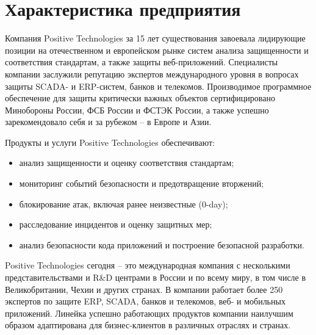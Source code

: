 \section{Характеристика предприятия}

Компания Positive Technologies за 15 лет существования завоевала лидирующие позиции на отечественном и европейском рынке систем анализа защищенности и соответствия стандартам, а также защиты веб-приложений. Специалисты компании заслужили репутацию экспертов международного уровня в вопросах защиты SCADA- и ERP-систем, банков и телекомов. Производимое программное обеспечение для защиты критически важных объектов сертифицировано Минобороны России, ФСБ России и ФСТЭК России, а также успешно зарекомендовало себя и за рубежом – в Европе и Азии.\par

Продукты и услуги Positive Technologies обеспечивают:
\begin{itemize}
    \item анализ защищенности и оценку соответствия стандартам;
    \item мониторинг событий безопасности и предотвращение вторжений;
    \item блокирование атак, включая ранее неизвестные (0-day);
    \item расследование инцидентов и оценку защитных мер;
    \item анализ безопасности кода приложений и построение безопасной разработки.
\end{itemize}

Positive Technologies сегодня -- это международная компания с несколькими представительствами и R\&D центрами в России и по всему миру, в том числе в Великобритании, Чехии и других странах. В компании работает более 250 экспертов по защите ERP, SCADA, банков и телекомов, веб- и мобильных приложений. Линейка успешно работающих продуктов компании наилучшим образом адаптирована для бизнес-клиентов в различных отраслях и странах.\par

